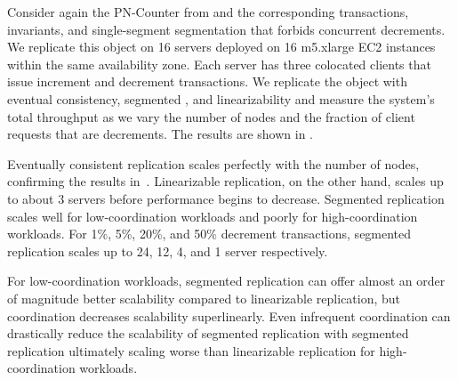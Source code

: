   Consider again the PN-Counter from  and the
  corresponding transactions, invariants, and single-segment segmentation that
  forbids concurrent decrements.
  We replicate this object on 16 servers deployed on 16 m5.xlarge EC2 instances
  within the same availability zone.  Each server has three colocated clients
  that issue increment and decrement transactions.
  We replicate the object with eventual consistency, segmented
  \invariantconfluence{}, and linearizability and measure the system's total
  throughput as we vary the number of nodes and the fraction of client requests
  that are decrements.  The results are shown in .


  Eventually consistent replication scales perfectly with the number of nodes,
  confirming the results in~\cite{bailis2014coordination}. Linearizable
  replication, on the other hand, scales up to about 3 servers before
  performance begins to decrease. Segmented \invariantconfluent{} replication
  scales well for low-coordination workloads and poorly for high-coordination
  workloads. For 1\%, 5\%, 20\%, and 50\% decrement transactions, segmented
  \invariantconfluent{} replication scales up to 24, 12, 4, and 1 server
  respectively.

  For low-coordination workloads, segmented \invariantconfluent{} replication
  can offer almost an order of magnitude better scalability compared to
  linearizable replication, but coordination decreases scalability
  superlinearly. Even infrequent coordination can drastically reduce the
  scalability of segmented \invariantconfluent{} replication with segmented
  \invariantconfluent{} replication ultimately scaling worse than linearizable
  replication for high-coordination workloads.
